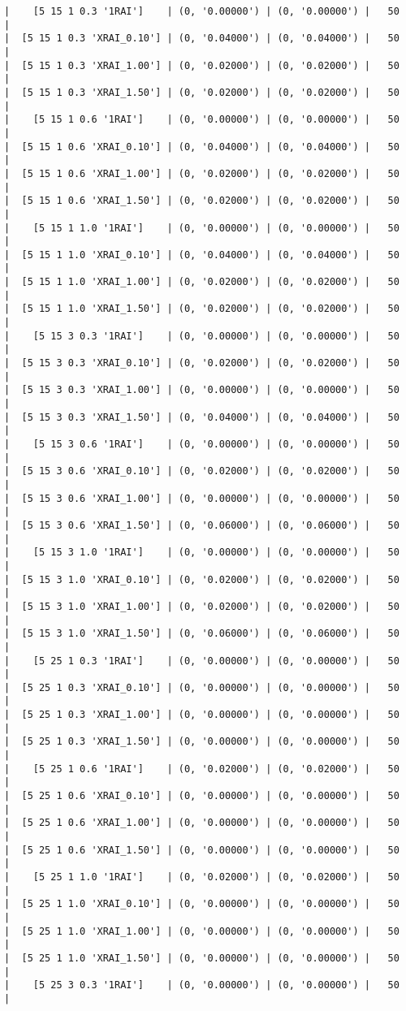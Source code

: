 \documentclass{article}
\begin{document}
\begin{verbatim}
|    [5 15 1 0.3 '1RAI']    | (0, '0.00000') | (0, '0.00000') |   50  |
|  [5 15 1 0.3 'XRAI_0.10'] | (0, '0.04000') | (0, '0.04000') |   50  |
|  [5 15 1 0.3 'XRAI_1.00'] | (0, '0.02000') | (0, '0.02000') |   50  |
|  [5 15 1 0.3 'XRAI_1.50'] | (0, '0.02000') | (0, '0.02000') |   50  |
|    [5 15 1 0.6 '1RAI']    | (0, '0.00000') | (0, '0.00000') |   50  |
|  [5 15 1 0.6 'XRAI_0.10'] | (0, '0.04000') | (0, '0.04000') |   50  |
|  [5 15 1 0.6 'XRAI_1.00'] | (0, '0.02000') | (0, '0.02000') |   50  |
|  [5 15 1 0.6 'XRAI_1.50'] | (0, '0.02000') | (0, '0.02000') |   50  |
|    [5 15 1 1.0 '1RAI']    | (0, '0.00000') | (0, '0.00000') |   50  |
|  [5 15 1 1.0 'XRAI_0.10'] | (0, '0.04000') | (0, '0.04000') |   50  |
|  [5 15 1 1.0 'XRAI_1.00'] | (0, '0.02000') | (0, '0.02000') |   50  |
|  [5 15 1 1.0 'XRAI_1.50'] | (0, '0.02000') | (0, '0.02000') |   50  |
|    [5 15 3 0.3 '1RAI']    | (0, '0.00000') | (0, '0.00000') |   50  |
|  [5 15 3 0.3 'XRAI_0.10'] | (0, '0.02000') | (0, '0.02000') |   50  |
|  [5 15 3 0.3 'XRAI_1.00'] | (0, '0.00000') | (0, '0.00000') |   50  |
|  [5 15 3 0.3 'XRAI_1.50'] | (0, '0.04000') | (0, '0.04000') |   50  |
|    [5 15 3 0.6 '1RAI']    | (0, '0.00000') | (0, '0.00000') |   50  |
|  [5 15 3 0.6 'XRAI_0.10'] | (0, '0.02000') | (0, '0.02000') |   50  |
|  [5 15 3 0.6 'XRAI_1.00'] | (0, '0.00000') | (0, '0.00000') |   50  |
|  [5 15 3 0.6 'XRAI_1.50'] | (0, '0.06000') | (0, '0.06000') |   50  |
|    [5 15 3 1.0 '1RAI']    | (0, '0.00000') | (0, '0.00000') |   50  |
|  [5 15 3 1.0 'XRAI_0.10'] | (0, '0.02000') | (0, '0.02000') |   50  |
|  [5 15 3 1.0 'XRAI_1.00'] | (0, '0.02000') | (0, '0.02000') |   50  |
|  [5 15 3 1.0 'XRAI_1.50'] | (0, '0.06000') | (0, '0.06000') |   50  |
|    [5 25 1 0.3 '1RAI']    | (0, '0.00000') | (0, '0.00000') |   50  |
|  [5 25 1 0.3 'XRAI_0.10'] | (0, '0.00000') | (0, '0.00000') |   50  |
|  [5 25 1 0.3 'XRAI_1.00'] | (0, '0.00000') | (0, '0.00000') |   50  |
|  [5 25 1 0.3 'XRAI_1.50'] | (0, '0.00000') | (0, '0.00000') |   50  |
|    [5 25 1 0.6 '1RAI']    | (0, '0.02000') | (0, '0.02000') |   50  |
|  [5 25 1 0.6 'XRAI_0.10'] | (0, '0.00000') | (0, '0.00000') |   50  |
|  [5 25 1 0.6 'XRAI_1.00'] | (0, '0.00000') | (0, '0.00000') |   50  |
|  [5 25 1 0.6 'XRAI_1.50'] | (0, '0.00000') | (0, '0.00000') |   50  |
|    [5 25 1 1.0 '1RAI']    | (0, '0.02000') | (0, '0.02000') |   50  |
|  [5 25 1 1.0 'XRAI_0.10'] | (0, '0.00000') | (0, '0.00000') |   50  |
|  [5 25 1 1.0 'XRAI_1.00'] | (0, '0.00000') | (0, '0.00000') |   50  |
|  [5 25 1 1.0 'XRAI_1.50'] | (0, '0.00000') | (0, '0.00000') |   50  |
|    [5 25 3 0.3 '1RAI']    | (0, '0.00000') | (0, '0.00000') |   50  |

\end{verbatim}
\end{document}
